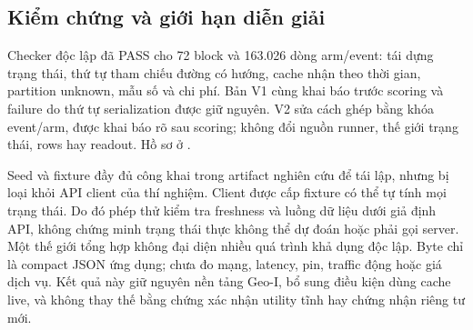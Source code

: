 \subsection{Kiểm chứng và giới hạn diễn giải}

Checker độc lập đã PASS cho 72 block và 163.026 dòng arm/event: tái dựng
trạng thái, thứ tự tham chiếu đường có hướng, cache nhận theo thời gian,
partition unknown, mẫu số và chi phí. Bản V1 cùng khai báo trước scoring và
failure do thứ tự serialization được giữ nguyên. V2 sửa cách ghép bằng
khóa event/arm, được khai báo rõ sau scoring; không đổi nguồn runner, thế
giới trạng thái, rows hay readout. Hồ sơ ở
.

Seed và fixture đầy đủ công khai trong artifact nghiên cứu để tái lập,
nhưng bị loại khỏi API client của thí nghiệm. Client được cấp fixture có
thể tự tính mọi trạng thái. Do đó phép thử kiểm tra freshness và luồng dữ
liệu dưới giả định API, không chứng minh trạng thái thực không thể dự đoán
hoặc phải gọi server. Một thế giới tổng hợp không đại diện nhiều quá trình
khả dụng độc lập. Byte chỉ là compact JSON ứng dụng; chưa đo mạng, latency,
pin, traffic động hoặc giá dịch vụ. Kết quả này giữ nguyên nền tảng Geo-I,
bổ sung điều kiện dùng cache live, và không thay thế bằng chứng xác nhận
utility tĩnh hay chứng nhận riêng tư mới.

